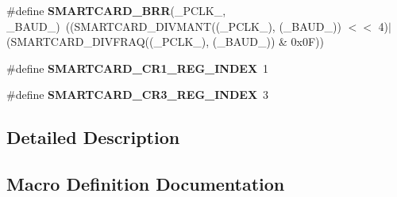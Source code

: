 \begin{DoxyCompactItemize}
\item 
\#define {\bfseries S\+M\+A\+R\+T\+C\+A\+R\+D\+\_\+\+B\+RR}(\+\_\+\+P\+C\+L\+K\+\_\+,  \+\_\+\+B\+A\+U\+D\+\_\+)~((S\+M\+A\+R\+T\+C\+A\+R\+D\+\_\+\+D\+I\+V\+M\+A\+NT((\+\_\+\+P\+C\+L\+K\+\_\+), (\+\_\+\+B\+A\+U\+D\+\_\+)) $<$$<$ 4)$\vert$(S\+M\+A\+R\+T\+C\+A\+R\+D\+\_\+\+D\+I\+V\+F\+R\+AQ((\+\_\+\+P\+C\+L\+K\+\_\+), (\+\_\+\+B\+A\+U\+D\+\_\+)) \& 0x0\+F))\hypertarget{group___s_m_a_r_t_c_a_r_d___private___constants_ga727e15608b487d6e9612f16dff770ea1}{}\label{group___s_m_a_r_t_c_a_r_d___private___constants_ga727e15608b487d6e9612f16dff770ea1}

\item 
\#define {\bfseries S\+M\+A\+R\+T\+C\+A\+R\+D\+\_\+\+C\+R1\+\_\+\+R\+E\+G\+\_\+\+I\+N\+D\+EX}~1\hypertarget{group___s_m_a_r_t_c_a_r_d___private___constants_ga1ed65e7988be93885090a31dde4531fa}{}\label{group___s_m_a_r_t_c_a_r_d___private___constants_ga1ed65e7988be93885090a31dde4531fa}

\item 
\#define {\bfseries S\+M\+A\+R\+T\+C\+A\+R\+D\+\_\+\+C\+R3\+\_\+\+R\+E\+G\+\_\+\+I\+N\+D\+EX}~3\hypertarget{group___s_m_a_r_t_c_a_r_d___private___constants_gaef244224b211c28507ab67bb846aa37d}{}\label{group___s_m_a_r_t_c_a_r_d___private___constants_gaef244224b211c28507ab67bb846aa37d}

\end{DoxyCompactItemize}


\subsection{Detailed Description}


\subsection{Macro Definition Documentation}
